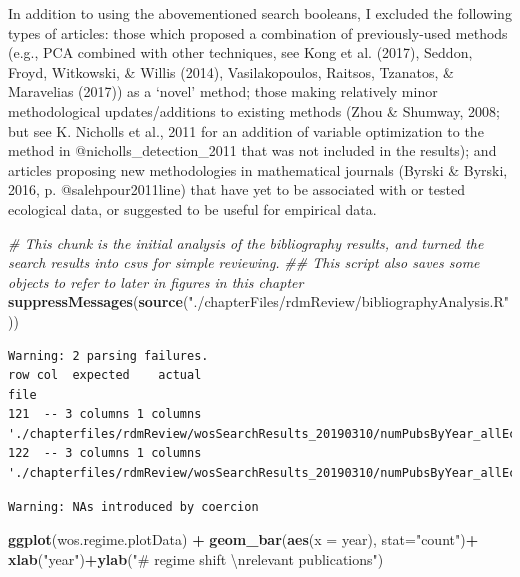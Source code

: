 \documentclass[12pt,twoside,openany]{reedthesis}
\newenvironment{Shaded}{\begin{snugshade}}{\end{snugshade}}
\newcommand{\CharTok}[1]{\textcolor[rgb]{0.31,0.60,0.02}{#1}}
\newcommand{\CommentTok}[1]{\textcolor[rgb]{0.56,0.35,0.01}{\textit{#1}}}
\newcommand{\DataTypeTok}[1]{\textcolor[rgb]{0.13,0.29,0.53}{#1}}
\newcommand{\KeywordTok}[1]{\textcolor[rgb]{0.13,0.29,0.53}{\textbf{#1}}}
\newcommand{\NormalTok}[1]{#1}
\newcommand{\OperatorTok}[1]{\textcolor[rgb]{0.81,0.36,0.00}{\textbf{#1}}}
\newcommand{\StringTok}[1]{\textcolor[rgb]{0.31,0.60,0.02}{#1}}
\begin{document}
In addition to using the abovementioned search booleans, I excluded the following types of articles: those which proposed a combination of previously-used methods (e.g., PCA combined with other techniques, see Kong et al. (2017), Seddon, Froyd, Witkowski, \& Willis (2014), Vasilakopoulos, Raitsos, Tzanatos, \& Maravelias (2017)) as a `novel' method; those making relatively minor methodological updates/additions to existing methods (Zhou \& Shumway, 2008; but see K. Nicholls et al., 2011 for an addition of variable optimization to the method in @nicholls\_detection\_2011 that was not included in the results); and articles proposing new methodologies in mathematical journals (Byrski \& Byrski, 2016, p. @salehpour2011line) that have yet to be associated with or tested ecological data, or suggested to be useful for empirical data.
\begin{Shaded}
\begin{Highlighting}[]
\CommentTok{# This chunk is the initial analysis of the bibliography results, and turned the search results into csvs for simple reviewing. }
\CommentTok{## This script also saves some objects to refer to later in figures in this chapter}
\KeywordTok{suppressMessages}\NormalTok{(}\KeywordTok{source}\NormalTok{(}\StringTok{"./chapterFiles/rdmReview/bibliographyAnalysis.R"}\NormalTok{))}
\end{Highlighting}
\end{Shaded}
\begin{verbatim}
Warning: 2 parsing failures.
row col  expected    actual                                                                              file
121  -- 3 columns 1 columns './chapterfiles/rdmReview/wosSearchResults_20190310/numPubsByYear_allEcology.txt'
122  -- 3 columns 1 columns './chapterfiles/rdmReview/wosSearchResults_20190310/numPubsByYear_allEcology.txt'
\end{verbatim}
\begin{verbatim}
Warning: NAs introduced by coercion
\end{verbatim}
\begin{Shaded}
\begin{Highlighting}[]
\KeywordTok{ggplot}\NormalTok{(wos.regime.plotData) }\OperatorTok{+}
\StringTok{  }\KeywordTok{geom_bar}\NormalTok{(}\KeywordTok{aes}\NormalTok{(}\DataTypeTok{x =}\NormalTok{ year), }\DataTypeTok{stat=}\StringTok{"count"}\NormalTok{)}\OperatorTok{+}
\StringTok{  }\KeywordTok{xlab}\NormalTok{(}\StringTok{"year"}\NormalTok{)}\OperatorTok{+}\KeywordTok{ylab}\NormalTok{(}\StringTok{"# regime shift }\CharTok{\textbackslash{}n}\StringTok{relevant publications"}\NormalTok{)}
\end{Highlighting}
\end{Shaded}
\end{document}
